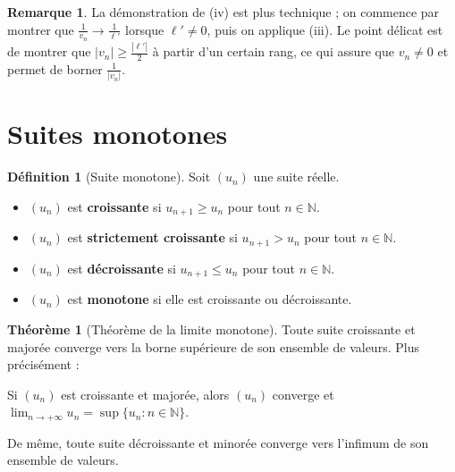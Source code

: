 \documentclass[12pt,a4paper,openany]{book}
\theoremstyle{definition}
\newtheorem{definition}{Définition}[chapter]
\newtheorem{theoreme}{Théorème}[chapter]
\newtheorem{remarque}{Remarque}[chapter]
\newcommand{\N}{\mathbb{N}}
\newcommand{\abs}[1]{\left\lvert #1 \right\rvert}
\begin{document}
\begin{remarque}
  La démonstration de (iv) est plus technique ; on commence par montrer que
  $\frac{1}{v_n} \to \frac{1}{\ell'}$ lorsque $\ell' \neq 0$, puis on applique (iii).
  Le point délicat est de montrer que $\abs{v_n} \geq \frac{\abs{\ell'}}{2}$ à partir
  d'un certain rang, ce qui assure que $v_n \neq 0$ et permet de borner $\frac{1}{\abs{v_n}}$.
\end{remarque}

\section{Suites monotones}\label{sec:suites:monotones}

\begin{definition}[Suite monotone]\label{def:suite-monotone}
  Soit $(u_n)$ une suite réelle.
  \begin{itemize}
    \item $(u_n)$ est \textbf{croissante} si $u_{n+1} \geq u_n$ pour tout $n \in \N$.
    \item $(u_n)$ est \textbf{strictement croissante} si $u_{n+1} > u_n$ pour tout $n \in \N$.
    \item $(u_n)$ est \textbf{décroissante} si $u_{n+1} \leq u_n$ pour tout $n \in \N$.
    \item $(u_n)$ est \textbf{monotone} si elle est croissante ou décroissante.
  \end{itemize}
\end{definition}

\begin{theoreme}[Théorème de la limite monotone]\label{thm:limite-monotone}
  Toute suite croissante et majorée converge vers la borne supérieure de son ensemble de
  valeurs. Plus précisément :

  Si $(u_n)$ est croissante et majorée, alors $(u_n)$ converge et
  $\lim_{n \to +\infty} u_n = \sup\{u_n : n \in \N\}$.

  De même, toute suite décroissante et minorée converge vers l'infimum de son ensemble de valeurs.
\end{theoreme}
\end{document}
